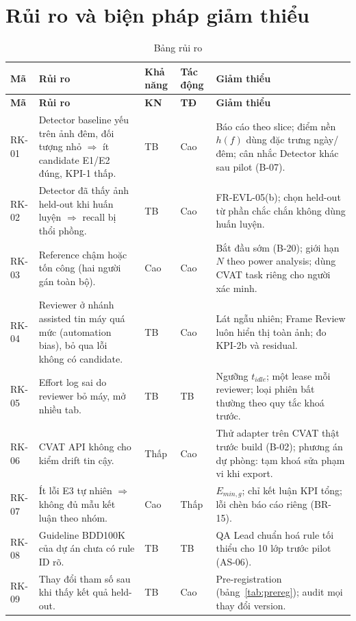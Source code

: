 \section{Rủi ro và biện pháp giảm thiểu}
\label{sec:risks}
\begin{xltabular}{\linewidth}{@{}L{1.2cm}Y C{1.1cm}C{1.1cm}Y@{}}
\caption{Bảng rủi ro}\label{tab:risks}\\
\toprule
\textbf{Mã} & \textbf{Rủi ro} & \textbf{Khả năng} & \textbf{Tác động} & \textbf{Giảm thiểu}\\
\midrule
\endfirsthead
\toprule \textbf{Mã} & \textbf{Rủi ro} & \textbf{KN} & \textbf{TĐ} & \textbf{Giảm thiểu}\\ \midrule
\endhead
\bottomrule
\endfoot
RK-01 & Detector baseline yếu trên ảnh đêm, đối tượng nhỏ $\Rightarrow$ ít candidate E1/E2 đúng, KPI-1 thấp. & TB & Cao & Báo cáo theo slice; điểm nền \(h(f)\) dùng đặc trưng ngày/đêm; cân nhắc Detector khác sau pilot (B-07).\\
RK-02 & Detector đã thấy ảnh held-out khi huấn luyện $\Rightarrow$ recall bị thổi phồng. & TB & Cao & FR-EVL-05(b); chọn held-out từ phần chắc chắn không dùng huấn luyện.\\
RK-03 & Reference chậm hoặc tốn công (hai người gán toàn bộ). & Cao & Cao & Bắt đầu sớm (B-20); giới hạn \(N\) theo power analysis; dùng CVAT task riêng cho người xác minh.\\
RK-04 & Reviewer ở nhánh assisted tin máy quá mức (automation bias), bỏ qua lỗi không có candidate. & TB & Cao & Lát ngẫu nhiên; Frame Review luôn hiển thị toàn ảnh; đo KPI-2b và residual.\\
RK-05 & Effort log sai do reviewer bỏ máy, mở nhiều tab. & TB & TB & Ngưỡng \(t_{idle}\); một lease mỗi reviewer; loại phiên bất thường theo quy tắc khoá trước.\\
RK-06 & CVAT API không cho kiểm drift tin cậy. & Thấp & Cao & Thử adapter trên CVAT thật trước build (B-02); phương án dự phòng: tạm khoá sửa phạm vi khi export.\\
RK-07 & Ít lỗi E3 tự nhiên $\Rightarrow$ không đủ mẫu kết luận theo nhóm. & Cao & Thấp & \(E_{min,g}\); chỉ kết luận KPI tổng; lỗi chèn báo cáo riêng (BR-15).\\
RK-08 & Guideline BDD100K của dự án chưa có rule ID rõ. & TB & TB & QA Lead chuẩn hoá rule tối thiểu cho 10 lớp trước pilot (AS-06).\\
RK-09 & Thay đổi tham số sau khi thấy kết quả held-out. & TB & Cao & Pre-registration (bảng~\ref{tab:prereg}); audit mọi thay đổi version.\\
\end{xltabular}

